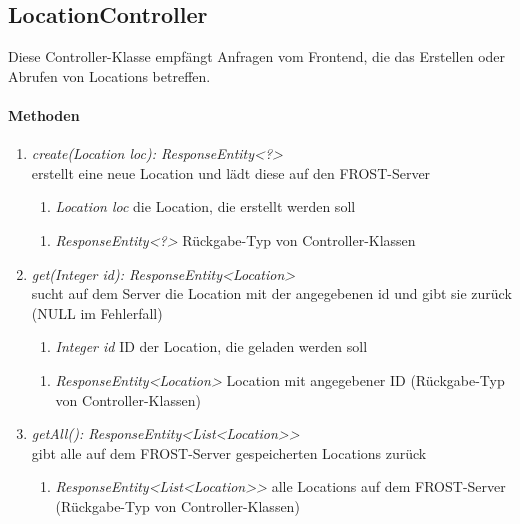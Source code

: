 \subsection*{LocationController}\label{locCon}
Diese Controller-Klasse empfängt Anfragen vom Frontend, die das Erstellen oder Abrufen von Locations betreffen.

\paragraph{Methoden}

\begin{enumerate}[+]
	\item \textit{ create(Location loc): ResponseEntity<?> }\\
	erstellt eine neue Location und lädt diese auf den FROST-Server
	
	\begin{enumerate}[$\bullet$]
		\item \textit{Location loc} die Location, die erstellt werden soll
		
	\end{enumerate}
	\vspace{-0.2cm}
	\begin{enumerate}[$\circ$]
		\item \textit{ResponseEntity<?>} Rückgabe-Typ von Controller-Klassen
	\end{enumerate}
	
	\item \textit{ get(Integer id): ResponseEntity<Location> }\\
	sucht auf dem Server die Location mit der angegebenen id und gibt sie zurück (NULL im Fehlerfall)
	
	\begin{enumerate}[$\bullet$]
		\item \textit{Integer id} ID der Location, die geladen werden soll
		
	\end{enumerate}
	\vspace{-0.2cm}
	\begin{enumerate}[$\circ$]
		\item \textit{ResponseEntity<Location>} Location mit angegebener ID (Rückgabe-Typ von Controller-Klassen)
	\end{enumerate}
	\item \textit{ getAll(): ResponseEntity<List<Location>> }\\
	gibt alle auf dem FROST-Server gespeicherten Locations zurück
	
	\begin{enumerate}[$\circ$]
		\item \textit{ResponseEntity<List<Location>>} alle Locations auf dem FROST-Server (Rückgabe-Typ von Controller-Klassen)
	\end{enumerate}
	
	
\end{enumerate}	